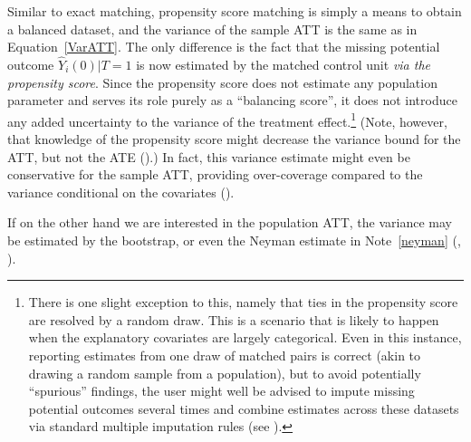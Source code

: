 \documentclass[11pt,titlepage]{article}
\begin{document}
\begin{comment}
An attractive property of the Neyman estimate is that it's
conservative, and could be justified as a population estimate (see
Note 2).  

Ultimately I think this is a question of default choice, and I'd be
happy to make the Neyman estimates the default with an option of using
the variance of the difference between matched pairs. 
\end{comment}

Similar to exact matching, propensity score matching is simply a means
to obtain a balanced dataset, and the
variance of the sample ATT is the same as in Equation~\ref{VarATT}.
The only difference is the fact that the missing potential outcome
$\hat{Y}_i(0) | T=1$ is now estimated by the matched control unit \emph{via the propensity
score}.  Since the propensity score does not estimate any population
parameter and serves its role purely as a ``balancing score'', it does
not introduce any added uncertainty to the variance of the treatment
effect.\footnote{There is one slight exception to this, namely that
  ties in the propensity score are resolved by a random draw.  This is
  a scenario that is likely to happen when the explanatory covariates
  are largely categorical.  Even in this instance, reporting estimates
  from one draw of matched pairs is correct (akin to drawing a random
  sample from a population), but to avoid potentially ``spurious'' findings, the 
  user might well be advised to impute
  missing potential outcomes several times and combine estimates
  across these datasets via standard multiple imputation rules
  (see \citealt{rubin87}).}  (Note, however, that knowledge of the propensity score might decrease the
variance bound for the ATT, but not the ATE
(\citealt{frolich02,hahn98,HirImbRid02}).)  In fact, this variance
estimate might even be conservative for the sample ATT, providing
over-coverage compared to the variance conditional on the
covariates (\citealt{AbaImbND}).

If on the other hand we are interested in the population ATT, the
variance may be estimated by the bootstrap, or even the Neyman
estimate in Note~\ref{neyman} (\citealt{ImbensNDb}, \citealt[Chapter
6]{ImbRubND}).

\begin{comment} 
Dan:  Should matching with replacement change the variance calculations? 
This might be the motivation for the Dehejia \& Wahba to bootstrap --
but there must be an analytical formula to reflect the bias-variance
tradeoff of matching with replacement...
\end{comment}
\end{document}
